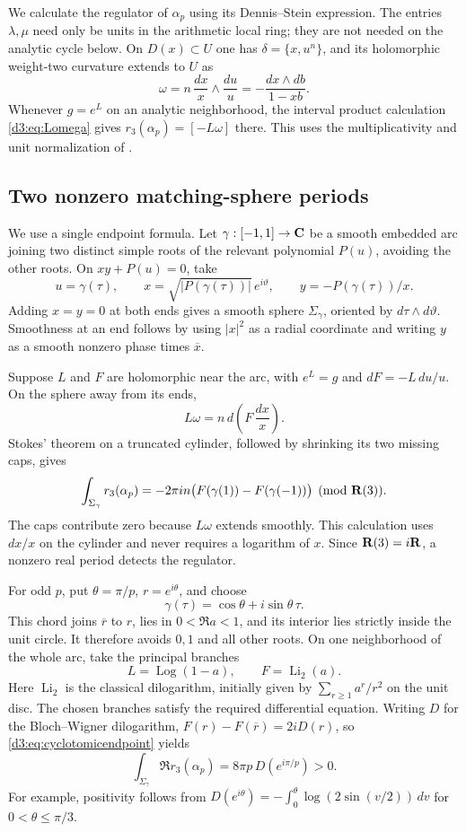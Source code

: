 We calculate the regulator of $\alpha_p$ using its Dennis--Stein expression.
The entries $\lambda,\mu$ need only be units in the arithmetic local ring;
they are not needed on the analytic cycle below.
On $D(x)\subset U$ one has $\delta=\{x,u^n\}$, and its holomorphic
weight-two curvature extends to $U$ as
\[
 \omega=n\,\frac{dx}{x}\wedge\frac{du}{u}
        =-\frac{dx\wedge db}{1-xb}.
\]
Whenever $g=e^L$ on an analytic neighborhood, the interval product
calculation \eqref{d3:eq:Lomega} gives
$r_3(\alpha_p)=[-L\omega]$ there.
This uses the multiplicativity and unit normalization of
\cite[Proposition~2.8, Theorem~2.31 and Lemma~4.5]{BunkeTamme}.

\subsection{Two nonzero matching-sphere periods}

We use a single endpoint formula. Let $\gamma:[-1,1]\to\mathbf C$ be a smooth
embedded arc joining two distinct simple roots of the relevant polynomial
$P(u)$, avoiding the other roots. On $xy+P(u)=0$, take
\[
 u=\gamma(\tau),\qquad
 x=\sqrt{|P(\gamma(\tau))|}\,e^{i\vartheta},\qquad
 y=-P(\gamma(\tau))/x.
\]
Adding $x=y=0$ at both ends gives a smooth sphere $\Sigma_\gamma$,
oriented by $d\tau\wedge d\vartheta$. Smoothness at an end follows by
using $|x|^2$ as a radial coordinate and writing $y$ as a smooth
nonzero phase times $\overline x$.

Suppose $L$ and $F$ are holomorphic near the arc, with
$e^L=g$ and $dF=-L\,du/u$. On the sphere away from its ends,
\[
 L\omega=n\,d\left(F\,\frac{dx}{x}\right).
\]
Stokes' theorem on a truncated cylinder, followed by shrinking its
two missing caps, gives
\begin{equation}\label{d3:eq:cyclotomicendpoint}
 \int_{\Sigma_\gamma}r_3(\alpha_p)
 =-2\pi i n\bigl(F(\gamma(1))-F(\gamma(-1))\bigr)
 \pmod{\mathbf R(3)}.
\end{equation}
The caps contribute zero because $L\omega$ extends smoothly.
This calculation uses $dx/x$ on the cylinder and never requires a
logarithm of $x$. Since $\mathbf R(3)=i\mathbf R$, a nonzero real period detects
the regulator.

For odd $p$, put $\theta=\pi/p$, $r=e^{i\theta}$, and choose
\[
 \gamma(\tau)=\cos\theta+i\sin\theta\,\tau .
\]
This chord joins $\overline r$ to $r$, lies in $0<\Re a<1$, and its
interior lies strictly inside the unit circle. It therefore avoids
$0,1$ and all other roots. On one neighborhood of the whole arc,
take the principal branches
\[
 L=\operatorname{Log}(1-a),\qquad F=\operatorname{Li}_2(a).
\]
Here $\operatorname{Li}_2$ is the classical dilogarithm, initially
given by $\sum_{r\geq1}a^r/r^2$ on the unit disc. The chosen
branches satisfy the required differential equation.
Writing $D$ for the Bloch--Wigner dilogarithm,
$F(r)-F(\overline r)=2iD(r)$, so \eqref{d3:eq:cyclotomicendpoint} yields
\begin{equation}\label{d3:eq:oddcyclotomicperiod}
 \int_{\Sigma_\gamma}\Re r_3(\alpha_p)
 =8\pi p\,D(e^{i\pi/p})>0.
\end{equation}
For example, positivity follows from
$D(e^{i\theta})=-\int_0^\theta\log(2\sin(v/2))\,dv$
for $0<\theta\leq\pi/3$.

